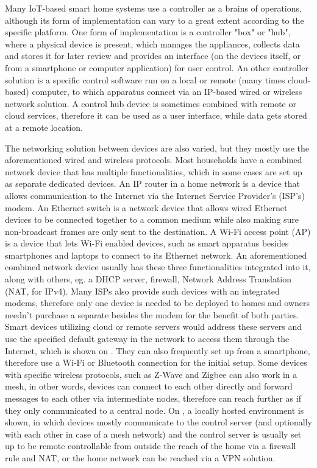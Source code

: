 Many IoT-based smart home systems use a controller as a brains of operations, although its form of implementation can vary to a great extent according to the specific platform. One form of implementation is a controller "box" or "hub", where a physical device is present, which manages the appliances, collects data and stores it for later review and provides an interface (on the devices itself, or from a smartphone or computer application) for user control. An other controller solution is a specific control software run on a local or remote (many times cloud-based) computer, to which apparatus connect via an IP-based wired or wireless network solution. A control hub device is sometimes combined with remote or cloud services, therefore it can be used as a user interface, while data gets stored at a remote location.

The networking solution between devices are also varied, but they mostly use the aforementioned wired and wireless protocols. Most households have a combined network device that has multiple functionalities, which in some cases are set up as separate dedicated devices. An IP router in a home network is a device that allows communication to the Internet via the Internet Service Provider's (ISP's) modem. An Ethernet switch is a network device that allows wired Ethernet devices to be connected together to a common medium while also making sure non-broadcast frames are only sent to the destination. A Wi-Fi access point (AP) is a device that lets Wi-Fi enabled devices, such as smart apparatus besides smartphones and laptops to connect to its Ethernet network. An aforementioned combined network device usually has these three functionalities integrated into it, along with others, eg. a DHCP server, firewall, Network Address Translation (NAT, for IPv4). Many ISPs also provide such devices with an integrated modems, therefore only one device is needed to be deployed to homes and owners needn't purchase a separate besides the modem for the benefit of both parties. Smart devices utilizing cloud or remote servers would address these servers and use the specified default gateway in the network to access them through the Internet, which is shown on . They can also frequently set up from a smartphone, therefore use a Wi-Fi or Bluetooth connection for the initial setup. Some devices with specific wireless protocols, such as Z-Wave and Zigbee can also work in a mesh, in other words, devices can connect to each other directly and forward messages to each other via intermediate nodes, therefore can reach further as if they only communicated to a central node. On , a locally hosted environment is shown, in which devices mostly communicate to the control server (and optionally with each other in case of a mesh network) and the control server is usually set up to be remote controllable from outside the reach of the home via a firewall rule and NAT, or the home network can be reached via a VPN solution.

